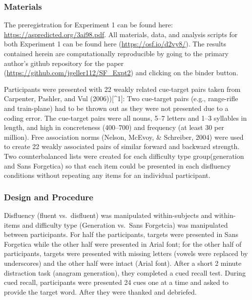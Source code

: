 \documentclass[english,doc]{apa6}
\begin{document}
\hypertarget{materials}{%
\subsubsection{Materials}\label{materials}}

The preregistration for Experiment 1 can be found here: \url{https://aspredicted.org/3ai98.pdf}. All materials, data, and analysis scripts for both Experiment 1 can be found here (\url{https://osf.io/d2vy8/}). The results contained herein are computationally reproducible by going to the primary author's github repository for the paper (\url{https://github.com/jgeller112/SF_Expt2}) and clicking on the binder button.

Participants were presented with 22 weakly related cue-target pairs taken from Carpenter, Pashler, and Vul (2006)){[}\^{}1{]}: Two cue-target pairs (e.g., range-rifle and train-plane) had to be thrown out as they were not presented due to a coding error. The cue-target pairs were all nouns, 5--7 letters and 1--3 syllables in length, and high in concreteness (400--700) and frequency (at least 30 per million). Free association norms (Nelson, McEvoy, \& Schreiber, 2004) were used to create 22 weakly associated pairs of similar forward and backward strength. Two counterbalanced lists were created for each difficulty type group(generation and Sans Forgetica) so that each item could be presented in each disfluency conditions without repeating any items for an individual participant.

\hypertarget{design-and-procedure}{%
\subsubsection{Design and Procedure}\label{design-and-procedure}}

Disfluency (fluent vs.~disfluent) was manipulated within-subjects and within-items and difficulty type (Generation vs.~Sans Forgetcia) was manipulated between participants. For half the participants, targets were presented in Sans Forgetica while the other half were presented in Arial font; for the other half of participants, targets were presented with missing letters (vowels were replaced by underscores) and the other half were intact (Arial font). After a short 2 minute distraction task (anagram generation), they completed a cued recall test. During cued recall, participants were presented 24 cues one at a time and asked to provide the target word. After they were thanked and debriefed.
\end{document}

